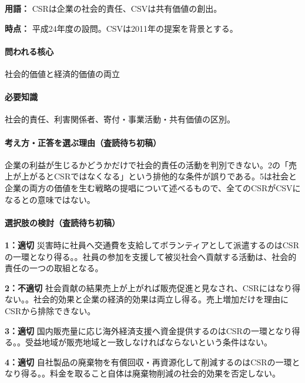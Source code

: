 \noindent\textbf{用語：} CSRは企業の社会的責任、CSVは共有価値の創出。\par

\noindent\textbf{時点：} 平成24年度の設問。CSVは2011年の提案を背景とする。\par

\paragraph{問われる核心} 社会的価値と経済的価値の両立

\paragraph{必要知識} 社会的責任、利害関係者、寄付・事業活動・共有価値の区別。

\paragraph{考え方・正答を選ぶ理由（査読待ち初稿）} 企業の利益が生じるかどうかだけで社会的責任の活動を判別できない。2の「売上が上がるとCSRではなくなる」という排他的な条件が誤りである。5は社会と企業の両方の価値を生む戦略の提唱について述べるもので、全てのCSRがCSVになるとの意味ではない。

\paragraph{選択肢の検討（査読待ち初稿）}\mbox{}\par

\noindent\textbf{1：適切} 災害時に社員へ交通費を支給してボランティアとして派遣するのはCSRの一環となり得る。。社員の参加を支援して被災社会へ貢献する活動は、社会的責任の一つの取組となる。\par

\noindent\textbf{2：不適切} 社会貢献の結果売上が上がれば販売促進と見なされ、CSRにはなり得ない。。社会的効果と企業の経済的効果は両立し得る。売上増加だけを理由にCSRから排除できない。\par

\noindent\textbf{3：適切} 国内販売量に応じ海外経済支援へ資金提供するのはCSRの一環となり得る。。受益地域が販売地域と一致しなければならないという条件はない。\par

\noindent\textbf{4：適切} 自社製品の廃棄物を有償回収・再資源化して削減するのはCSRの一環となり得る。。料金を取ること自体は廃棄物削減の社会的効果を否定しない。\par

